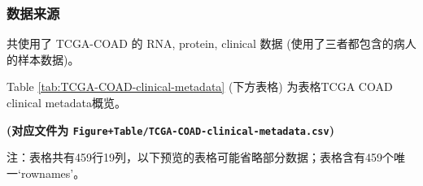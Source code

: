 \documentclass[
]{article}
\begin{document}
\hypertarget{ux6570ux636eux6765ux6e90-1}{%
\subsubsection{数据来源}\label{ux6570ux636eux6765ux6e90-1}}

共使用了 TCGA-COAD 的 RNA, protein, clinical 数据 (使用了三者都包含的病人的样本数据)。

Table \ref{tab:TCGA-COAD-clinical-metadata} (下方表格) 为表格TCGA COAD clinical metadata概览。

\textbf{(对应文件为 \texttt{Figure+Table/TCGA-COAD-clinical-metadata.csv})}

\begin{center}\begin{tcolorbox}[colback=gray!10, colframe=gray!50, width=0.9\linewidth, arc=1mm, boxrule=0.5pt]注：表格共有459行19列，以下预览的表格可能省略部分数据；表格含有459个唯一`rownames'。
\end{tcolorbox}
\end{center}
\end{document}
